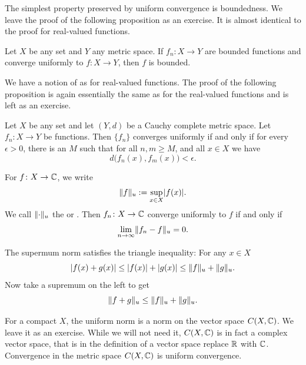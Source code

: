 The simplest property preserved by uniform convergence is
boundedness.  We leave the proof of the following proposition as an
exercise.  It is almost identical to the proof for real-valued functions.

\begin{prop} \label{prop:uniformconvbounded}
Let $X$ be any set and $Y$ any metric space.
If $f_n \colon X \to Y$ are bounded functions and converge uniformly to $f
\colon X \to Y$, then $f$ is bounded.
\end{prop}

We have a notion of \emph{} as for
real-valued functions.  The proof of the following proposition is
again essentially the same as for the real-valued functions and 
is left as an exercise.

\begin{prop} \label{prop:unifcauchymetric}
Let $X$ be any set and let $(Y,d)$ be a Cauchy complete metric space.
Let $f_n \colon X \to Y$ be functions.  Then $\{ f_n \}$ converges
uniformly if and only if for every $\epsilon > 0$, there is an $M$ such that
for all $n, m \geq M$, and all $x \in X$ we have
\begin{equation*}
d\bigl(f_n(x),f_m(x)\bigr) < \epsilon .
\end{equation*}
\end{prop}

For $f \colon X \to {\mathbb{C}}$, we write
\begin{equation*}
\lVert {f} \rVert_u := \sup_{x \in X} \lvert {f(x)} \rvert .
\end{equation*}
We call $\lVert {\cdot} \rVert_u$
the \emph{} or \emph{}.
Then 
$f_n \colon X \to {\mathbb{C}}$ converge uniformly to $f$ if and only if
\begin{equation*}
\lim_{n\to \infty} \lVert {f_n-f} \rVert_u = 0 .
\end{equation*}

The supermum norm satisfies the triangle inequality: For any $x \in X$
\begin{equation*}
\lvert {f(x)+g(x)} \rvert \leq
\lvert {f(x)} \rvert+\lvert {g(x)} \rvert \leq
\lVert {f} \rVert_u+\lVert {g} \rVert_u .
\end{equation*}
Now take a supremum on the left to get
\begin{equation*}
\lVert {f+g} \rVert_u \leq
\lVert {f} \rVert_u+\lVert {g} \rVert_u .
\end{equation*}

For a compact $X$,
the uniform norm is a norm on the vector space $C(X,{\mathbb{C}})$.
We leave it as an exercise.
While we will not need it, $C(X,{\mathbb{C}})$ is in fact a complex
vector space, that is in the definition of a vector space replace
${\mathbb{R}}$ with ${\mathbb{C}}$.
Convergence in the metric space $C(X,{\mathbb{C}})$ is
uniform convergence.

